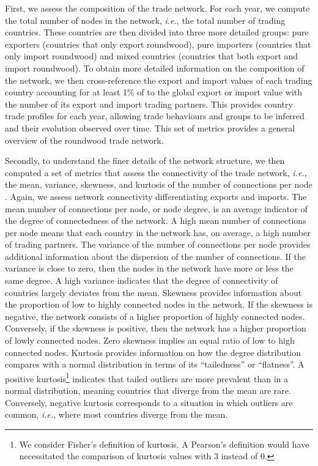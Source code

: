 \documentclass[
  authoryear,
  review,
  3p]{elsarticle}
\begin{document}
First, we assess the composition of the trade network. For each year, we
compute the total number of nodes in the network, \emph{i.e.}, the total
number of trading countries. These countries are then divided into three
more detailed groups: pure exporters (countries that only export
roundwood), pure importers (countries that only import roundwood) and
mixed countries (countries that both export and import roundwood). To
obtain more detailed information on the composition of the network, we
then cross-reference the export and import values of each trading
country accounting for at least 1\% of to the global export or import
value with the number of its export and import trading partners. This
provides country trade profiles for each year, allowing trade behaviours
and groups to be inferred and their evolution observed over time. This
set of metrics provides a general overview of the roundwood trade
network.

Secondly, to understand the finer details of the network structure, we
then computed a set of metrics that assess the connectivity of the trade
network, \emph{i.e.}, the mean, variance, skewness, and kurtosis of the
number of connections per node
\citep{albert_statistical_2002, newman_structure_2003}. Again, we assess
network connectivity differentiating exports and imports. The mean
number of connections per node, or node degree, is an average indicator
of the degree of connectedness of the network. A high mean number of
connections per node means that each country in the network has, on
average, a high number of trading partners. The variance of the number
of connections per node provides additional information about the
dispersion of the number of connections. If the variance is close to
zero, then the nodes in the network have more or less the same degree. A
high variance indicates that the degree of connectivity of countries
largely deviates from the mean. Skewness provides information about the
proportion of low to highly connected nodes in the network. If the
skewness is negative, the network consists of a higher proportion of
highly connected nodes. Conversely, if the skewness is positive, then
the network has a higher proportion of lowly connected nodes. Zero
skewness implies an equal ratio of low to high connected nodes. Kurtosis
provides information on how the degree distribution compares with a
normal distribution in terms of its ``tailedness'' or ``flatness''. A
positive kurtosis\footnote{We consider Fisher's definition of kurtosis.
  A Pearson's definition would have necessitated the comparison of
  kurtosis values with 3 instead of 0.} indicates that tailed outliers
are more prevalent than in a normal distribution, meaning countries that
diverge from the mean are rare. Conversely, negative kurtosis
corresponds to a situation in which outliers are common, \emph{i.e.},
where most countries diverge from the mean.
\end{document}
